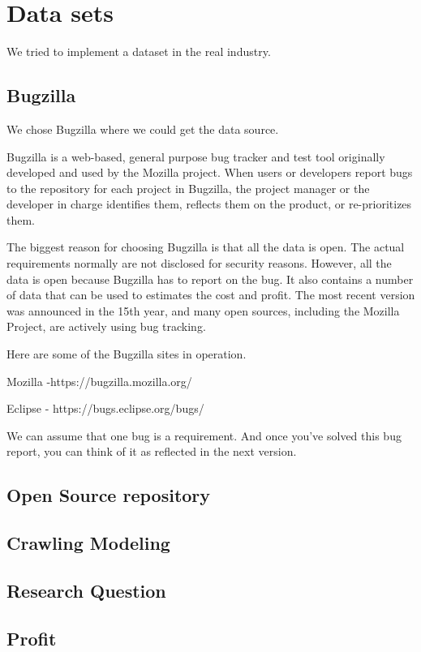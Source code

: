 \section{Data sets}
    We tried to implement a dataset in the real industry.
\subsection{Bugzilla}

    We chose Bugzilla where we could get the data source. 

Bugzilla is a web-based, general purpose bug tracker and test tool originally developed and used by the Mozilla project. When users or developers report bugs to the repository for each project in Bugzilla, the project manager or the developer in charge identifies them, reflects them on the product, or re-prioritizes them.

The biggest reason for choosing Bugzilla is that all the data is open. The actual requirements normally are not disclosed for security reasons. However, all the data is open because Bugzilla has to report on the bug. It also contains a number of data that can be used to estimates the cost and profit. The most recent version was announced in the 15th year, and many open sources, including the Mozilla Project, are actively using bug tracking.

Here are some of the Bugzilla sites in operation.


Mozilla -https://bugzilla.mozilla.org/

Eclipse - https://bugs.eclipse.org/bugs/


We can assume that one bug is a requirement. And once you've solved this bug report, you can think of it as reflected in the next version.



\subsection{Open Source repository}
\subsection{Crawling Modeling}
\subsection{Research Question}
\subsection{Profit}
